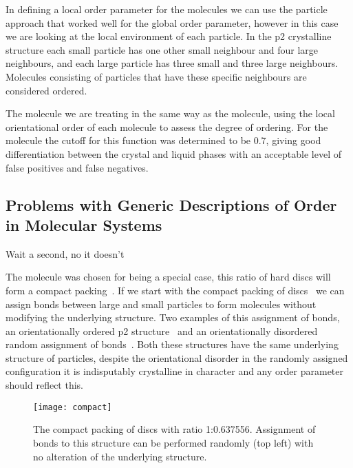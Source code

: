 In defining a local order parameter for the \dcon molecules we can use the particle approach that worked well for the global order parameter, however in this case we are looking at the local environment of each particle. In the p2 crystalline structure each small particle has one other small neighbour and four large neighbours, and each large particle has three small and three large neighbours. Molecules consisting of particles that have these specific neighbours are considered ordered.

The \tri molecule we are treating in the same way as the \done molecule, using the local orientational order of each molecule to assess the degree of ordering. For the \tri molecule the cutoff for this function was determined to be \num{0.7}, giving good differentiation between the crystal and liquid phases with an acceptable level of false positives and false negatives.

\subsection{Problems with Generic Descriptions of Order in Molecular Systems}

Wait a second, no it doesn't

The \dcon molecule was chosen for being a special case, this ratio of hard discs will form a compact packing~. If we start with the compact packing of discs~ we can assign bonds between large and small particles to form molecules without modifying the underlying structure. Two examples of this assignment of bonds, an orientationally ordered p2 structure~ and an orientationally disordered random assignment of bonds~. Both these structures have the same underlying structure of particles, despite the orientational disorder in the randomly assigned configuration it is indisputably crystalline in character and any order parameter should reflect this.

\begin{figure}
    \centering
    \texttt{[image: compact]}
    \caption{The compact packing of discs with ratio 1:0.637556. Assignment of bonds to this structure can be performed randomly (top left) with no alteration of the underlying structure.}
    \label{fig:compact}
\end{figure}

